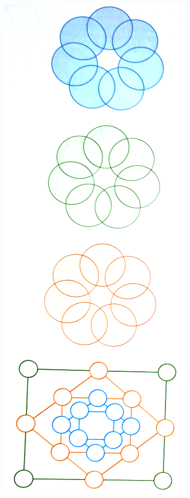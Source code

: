 \documentclass[a4paper,14pt]{article}
\begin{document}
\begin{multicols}{2}
\begin{enumerate}
    		\includegraphics[width=1.1\linewidth]{6FMA46_imagens/imagem5} 

\end{enumerate}
\end{multicols}
\end{document}
